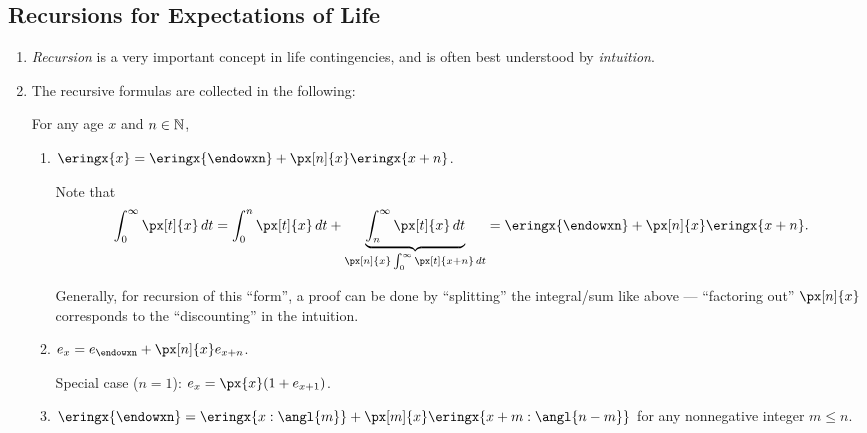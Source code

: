 \subsection{Recursions for Expectations of Life}
\begin{enumerate}
\item \emph{Recursion} is a very important concept in life contingencies, and
is often best understood by \emph{intuition}.
\item The recursive formulas are collected in the following:
\begin{proposition}
For any age \(x\) and \(n\in\mathbb{N}\),
\begin{enumerate}
\item \(\eringx{x}=\eringx{\endowxn}+\px[n]{x}\eringx{x+n}\).

\begin{intuition}

\end{intuition}

\begin{pf}
Note that
\[
\int_{0}^{\infty}\px[t]{x}\,dt
=\int_{0}^{n}\px[t]{x}\,dt
+\underbrace{\int_{n}^{\infty}\px[t]{x}\,dt}_{\px[n]{x}\int_{0}^{\infty}\px[t]{x+n}\,dt}
=\eringx{\endowxn}+\px[n]{x}\eringx{x+n}.
\]
\end{pf}

\begin{note}
Generally, for recursion of this ``form'', a proof can be done by ``splitting''
the integral/sum like above --- ``factoring out'' \(\px[n]{x}\) corresponds to the
``discounting'' in the intuition.
\end{note}
\item \(e_x=e_{\endowxn}+\px[n]{x}e_{x+n}\).
\begin{note}
Special case (\(n=1\)): \(e_x=\px{x}(1+e_{x+1})\).
\end{note}
\item \(\eringx{\endowxn}=\eringx{x:\angl{m}}+\px[m]{x}\eringx{x+m:\angl{n-m}}\) for any nonnegative integer \(m\le n\).


\end{enumerate}
\end{proposition}
\end{enumerate}
